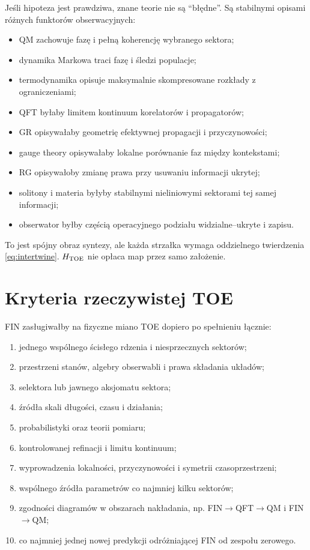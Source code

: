 \documentclass[11pt,a4paper]{article}
\begin{document}
Jeśli hipoteza jest prawdziwa, znane teorie nie są ``błędne''. Są stabilnymi opisami różnych funktorów obserwacyjnych:
\begin{itemize}
\item QM zachowuje fazę i pełną koherencję wybranego sektora;
\item dynamika Markowa traci fazę i śledzi populacje;
\item termodynamika opisuje maksymalnie skompresowane rozkłady z ograniczeniami;
\item QFT byłaby limitem kontinuum korelatorów i propagatorów;
\item GR opisywałaby geometrię efektywnej propagacji i przyczynowości;
\item gauge theory opisywałaby lokalne porównanie faz między kontekstami;
\item RG opisywałoby zmianę prawa przy usuwaniu informacji ukrytej;
\item solitony i materia byłyby stabilnymi nieliniowymi sektorami tej samej informacji;
\item obserwator byłby częścią operacyjnego podziału widzialne--ukryte i zapisu.
\end{itemize}

To jest spójny obraz syntezy, ale każda strzałka wymaga oddzielnego twierdzenia \eqref{eq:intertwine}. $H_{\rm TOE}$ nie opłaca map przez samo założenie.

\section{Kryteria rzeczywistej TOE}

FIN zasługiwałby na fizyczne miano TOE dopiero po spełnieniu łącznie:
\begin{enumerate}
\item jednego wspólnego ścisłego rdzenia i niesprzecznych sektorów;
\item przestrzeni stanów, algebry obserwabli i prawa składania układów;
\item selektora lub jawnego aksjomatu sektora;
\item źródła skali długości, czasu i działania;
\item probabilistyki oraz teorii pomiaru;
\item kontrolowanej refinacji i limitu kontinuum;
\item wyprowadzenia lokalności, przyczynowości i symetrii czasoprzestrzeni;
\item wspólnego źródła parametrów co najmniej kilku sektorów;
\item zgodności diagramów w obszarach nakładania, np. FIN$\to$QFT$\to$QM i FIN$\to$QM;
\item co najmniej jednej nowej predykcji odróżniającej FIN od zespołu zerowego.
\end{enumerate}
\end{document}
